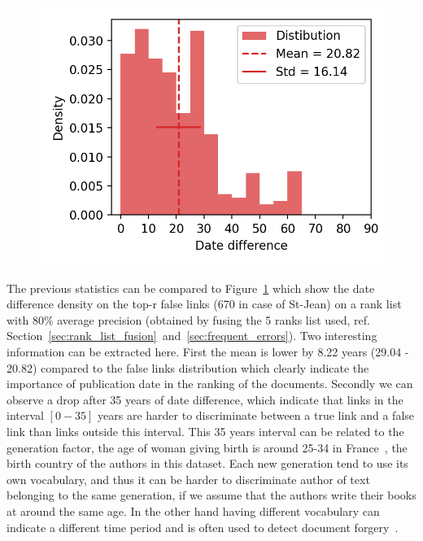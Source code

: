 \begin{figure}
  \label{fig:dates_differences_r_false}
  \includegraphics[width=\linewidth]{img/dates_differences_r_false.png}
\end{figure}

The previous statistics can be compared to Figure~\ref{fig:dates_differences_r_false} which show the date difference density on the top-r false links (670 in case of St-Jean) on a rank list with 80\% average precision (obtained by fusing the 5 ranks list used, ref. Section~\ref{sec:rank_list_fusion}~and~\ref{sec:frequent_errors}).
Two interesting information can be extracted here.
First the mean is lower by 8.22 years (29.04 - 20.82) compared to the false links distribution which clearly indicate the importance of publication date in the ranking of the documents.
Secondly we can observe a drop after 35 years of date difference, which indicate that links in the interval $\left[0-35\right]$ years are harder to discriminate between a true link and a false link than links outside this interval.
This 35 years interval can be related to the generation factor, the age of woman giving birth is around 25-34 in France~\cite{generations}, the birth country of the authors in this dataset.
Each new generation tend to use its own vocabulary, and thus it can be harder to discriminate author of text belonging to the same generation, if we assume that the authors write their books at around the same age.
In the other hand having different vocabulary can indicate a different time period and is often used to detect document forgery~\cite{savoy_stylo}.


